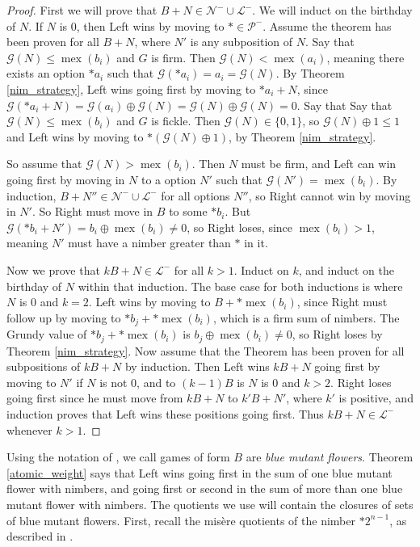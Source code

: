 \documentclass{amsart}
\theoremstyle{plain}
\theoremstyle{definition}
\theoremstyle{remark}
\numberwithin{equation}{section}
\numberwithin{thm}{section}
\DeclareMathOperator{\mex}{mex}
\begin{document}
\begin{proof}
First we will prove that $B+N \in \mathcal{N}^- \cup\mathcal{L}^-$.   We will induct on the birthday of $N$. If $N$ is $0$, then Left wins by moving to $* \in \mathcal{P}^-$. Assume the theorem has been proven for all $B+N$, where $N'$ is any subposition of $N$. Say that $\mathcal{G}(N) \leq \mex(b_i)$ and $G$ is firm. Then $\mathcal{G}(N) < \mex(a_i)$, meaning there exists an option $*a_i$ such that $\mathcal{G}(*a_i) = a_i = \mathcal{G}(N)$. By Theorem \ref{nim_strategy}, Left wins going first by moving to $*a_i + N$, since $\mathcal{G}(*a_i+N) = \mathcal{G}(a_i)\oplus\mathcal{G}(N) = \mathcal{G}(N)\oplus\mathcal{G}(N) = 0$.  Say that Say that $\mathcal{G}(N) \leq \mex(b_i)$ and $G$ is fickle. Then $\mathcal{G}(N) \in \{0,1\}$, so $\mathcal{G}(N) \oplus 1 \leq 1$ and Left wins by moving to $*(\mathcal{G}(N) \oplus 1)$, by Theorem \ref{nim_strategy}.
   
   So assume that $\mathcal{G}(N) > \mex(b_i)$. Then $N$ must be firm, and Left can win going first by moving in $N$ to a option $N'$ such that $\mathcal{G}(N') = \mex(b_i)$. By induction, $B+N'' \in \mathcal{N}^- \cup \mathcal{L}^-$ for all options $N''$, so Right cannot win by moving in $N'$. So Right must move in $B$ to some $*b_i$. But $\mathcal{G}(*b_i + N') = b_i \oplus \mex(b_i) \neq 0$, so Right loses, since $\mex(b_i) >1$, meaning $N'$ must have a nimber greater than $*$ in it.

   Now we prove that $kB + N \in \mathcal{L}^-$ for all $k>1$. Induct on $k$, and induct on the birthday of $N$ within that induction. The base case for both inductions is where $N$ is $0$ and $k = 2$. Left wins by moving to $B+*\mex(b_i)$, since Right must follow up by moving to $*b_j + *\mex(b_i)$, which is a firm sum of nimbers. The Grundy value of $*b_j + *\mex(b_i)$ is $b_j \oplus \mex(b_i) \neq 0$, so Right loses by Theorem \ref{nim_strategy}. Now assume that the Theorem has been proven for all subpositions of $kB +N$ by induction. Then Left wins $kB+N$ going first by moving to $N'$ if $N$ is not $0$, and to $(k-1)B$ is $N$ is $0$ and $k>2$. Right loses going first since he must move from $kB +N$ to $k'B + N'$, where $k '$ is positive, and induction proves that Left wins these positions going first. Thus $kB+N \in \mathcal{L}^-$ whenever $k > 1$.
\end{proof}

Using the notation of \cite{otherpaper}, we call games of form $B$ are \emph{blue mutant flowers}. Theorem \ref{atomic_weight}
 says that Left wins going first in the sum of one blue mutant flower with nimbers, and going first or second in the sum of more than one blue mutant flower with nimbers. The quotients we use will contain the closures of sets of blue mutant flowers. First, recall the mis\`ere quotients of the nimber $*2^{n-1}$, as described in \cite{plambeck2008misere}.
\end{document}
